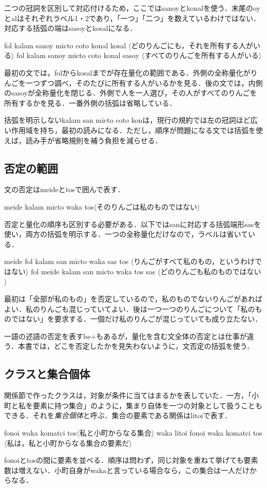 \documentclass[b5paper, 10pt]{ltjsarticle}
\newcommand{\ko}[1]{\textsf{#1}}
\newcommand{\sentence}[1]{$\langle$#1$\rangle$}
\begin{document}
二つの冠詞を区別して対応付けるため，ここでは\ko{sanoy}と\ko{konal}を使う．末尾の\ko{oy}と\ko{al}はそれぞれラベル1・2であり，「一つ」「二つ」を数えているわけではない．対応する括弧の端は\ko{sasoy}と\ko{kosal}になる．
\begin{exe}
    \ex \ko{fol kalam sanoy micto coto konal kosal}
    \glt \sentence{どのりんごにも，それを所有する人がいる}
    \ex \ko{fol kalam sanoy micto coto konal sasoy}
    \glt \sentence{すべてのりんごを所有する人がいる}
\end{exe}
最初の文では，\ko{fol}から\ko{kosal}までが存在量化の範囲である．外側の全称量化がりんごを一つずつ調べ，そのたびに所有する人がいるかを見る．後の文では，内側の\ko{sasoy}が全称量化を閉じる．外側で人を一人選び，その人がすべてのりんごを所有するかを見る．一番外側の括弧は省略している．

括弧を明示しない\ko{kalam san micto coto kon}は，現行の規約では左の冠詞ほど広い作用域を持ち，最初の読みになる．ただし，順序が問題になる文では括弧を使えば，読み手が省略規則を補う負担を減らせる．

\subsection{否定の範囲}
文の否定は\ko{meide}と\ko{tos}で囲んで表す．
\begin{exe}
    \ex \ko{meide kalam micto waka tos}\hfill \sentence{そのりんごは私のものではない}
\end{exe}
否定と量化の順序も区別する必要がある．以下では\ko{san}に対応する括弧端形\ko{sas}を使い，両方の括弧を明示する．一つの全称量化だけなので，ラベルは省いている．
\begin{exe}
    \ex \ko{meide fol kalam san micto waka sas tos}
    \glt \sentence{りんごがすべて私のもの，というわけではない}
    \ex \ko{fol meide kalam san micto waka tos sas}
    \glt \sentence{どのりんごも私のものではない}
\end{exe}
最初は「全部が私のもの」を否定しているので，私のものでないりんごがあればよい．私のりんごも混じっていてよい．後は一つ一つのりんごについて「私のものではない」を要求する．一個だけ私のりんごが混じっていても成り立たない．

一語の述語の否定を表す\ko{be+}もあるが，量化を含む文全体の否定とは仕事が違う．本書では，どこを否定したかを見失わないように，文否定の括弧を使う．

\subsection{クラスと集合個体}
関係節で作ったクラスは，対象が条件に当てはまるかを表していた．一方，「小町と私を要素に持つ集合」のように，集まり自体を一つの対象として扱うこともできる．それを\emph{集合個体}と呼ぶ．集合の要素である関係は\ko{litoi}で表す．
\begin{exe}
    \ex \ko{fonoi waka komatci tos}\hfill \sentence{私と小町からなる集合}
    \ex \ko{waka litoi fonoi waka komatci tos}
    \glt \sentence{私は，私と小町からなる集合の要素だ}
\end{exe}
\ko{fonoi}と\ko{tos}の間に要素を並べる．順序は問わず，同じ対象を重ねて挙げても要素数は増えない．小町自身が\ko{waka}と言っている場合なら，この集合は一人だけからなる．
\end{document}
